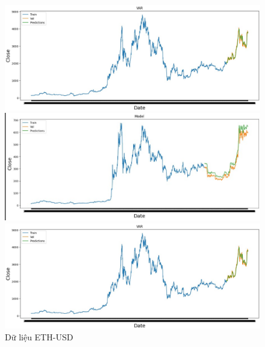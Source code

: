 \documentclass[conference]{IEEEtran}
\begin{document}
	\begin{figure}[H]
		\centering
		\begin{minipage}{0.15\textwidth}
			\centering
			\includegraphics[width=1\textwidth]{Figure/ETH_VAR.jpg}
		\end{minipage}
		\hfill
		\begin{minipage}{0.15\textwidth}
			\centering
			\includegraphics[width=1\textwidth]{Figure/VAR_I.jpg}
		\end{minipage}
		\hfill
		\begin{minipage}{0.15\textwidth}
			\centering
			\includegraphics[width=1\textwidth]{Figure/ETH_VAR.jpg}
		\end{minipage}
		\caption{Dữ liệu ETH-USD}
		\label{fig:1}
	\end{figure}
	
\end{document}
